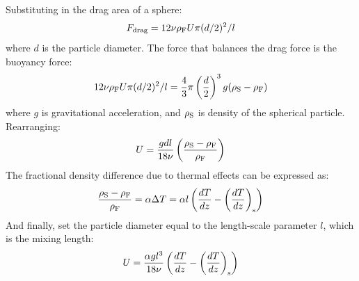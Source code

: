 Substituting in the drag area of a sphere:
\begin{equation}
F_{\rm drag} = 12 \nu \rho_{\rm F} U \pi (d/2)^2 / l
\end{equation}
where $d$ is the particle diameter.
The force that balances the drag force is the buoyancy force:
\begin{equation}
12 \nu \rho_{\rm F} U \pi (d/2)^2 / l = \frac{4}{3} \pi \left(\frac{d}{2}\right)^3 g (\rho_{\rm S} - \rho_{\rm F})
\end{equation}
where $g$ is gravitational acceleration, and $\rho_{\rm S}$ is density of the spherical particle.  Rearranging:
\begin{equation}
U = \frac{gdl}{18 \nu} \left( \frac{\rho_{\rm S} - \rho_{\rm F}}{\rho_{\rm F}} \right)
\end{equation}
The fractional density difference due to thermal effects can be expressed as:
\begin{equation}
\frac{\rho_{\rm S} - \rho_{\rm F}}{\rho_{\rm F}} = \alpha \Delta T = \alpha l \left( \frac{dT}{dz} - \left( \frac{dT}{dz} \right)_{\rm s} \right)
\end{equation}
And finally, set the particle diameter equal to the length-scale parameter $l$, which is the mixing length:
\begin{equation}
U = \frac{\alpha g l^3}{18 \nu} \left( \frac{dT}{dz} - \left( \frac{dT}{dz} \right)_{\rm s} \right)
\end{equation}
